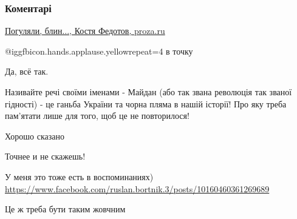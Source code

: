  
 
 
 
 
\subsubsection{Коментарі}

\begin{itemize} %

\href{https://proza.ru/2014/11/22/985}{
Погуляли, блин..., Костя Федотов, proza.ru%
}

 @igg{fbicon.hands.applause.yellow}{repeat=4} в точку

Да, всё так.


Називайте речі своїми іменами - Майдан (або так звана революція так званої
гідності) - це ганьба України та чорна пляма в нашій історії! Про яку треба
пам’ятати лише для того, щоб це не повторилося!


Хорошо сказано

Точнее и не скажешь!

У меня это тоже есть в воспоминаниях) \url{https://www.facebook.com/ruslan.bortnik.3/posts/10160460361269689}

Це ж треба бути таким жовчним

\end{itemize} %

